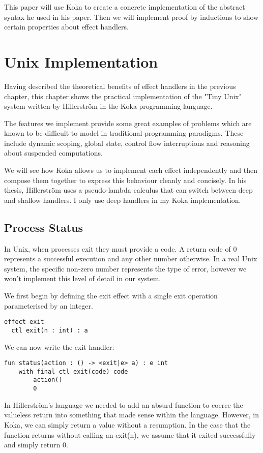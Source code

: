 \documentclass[logo,bsc,singlespacing,parskip]{infthesis}
\begin{document}
This paper will use Koka to create a concrete implementation of the abstract syntax he used in his paper. Then we will implement proof by inductions to show certain properties about effect handlers.

\chapter{Unix Implementation}
Having described the theoretical benefits of effect handlers in the previous chapter, this chapter shows the practical implementation of the "Tiny Unix" system written by Hillerström in the Koka programming language. 

The features we implement provide some great examples of problems which are known to be difficult to model in traditional programming paradigms.  These include dynamic scoping, global state, control flow interruptions and reasoning about suspended computations. 

We will see how Koka allows us to implement each effect independently and then compose them together to express this behaviour cleanly and concisely.
In his thesis, Hillerström uses a pseudo-lambda calculus that can switch between deep and shallow handlers. I only use deep handlers in my Koka implementation.



\section{Process Status}
In Unix, when processes exit they must provide a code. A return code of 0 represents a successful execution and any other number otherwise. In a real Unix system, the specific non-zero number represents the type of error, however we won't implement this level of detail in our system.

We first begin by defining the exit effect with a single exit operation parameterised by an integer.
\begin{lstlisting}
effect exit
  ctl exit(n : int) : a
\end{lstlisting}

We can now write the exit handler:
\begin{lstlisting}
fun status(action : () -> <exit|e> a) : e int
    with final ctl exit(code) code
        action()
        0
\end{lstlisting}
In Hillerström's language we needed to add an absurd function to coerce the valueless return into something that made sense within the language. However, in Koka, we can simply return a value without a resumption. In the case that the function returns without calling an exit(n), we assume that it exited successfully and simply return 0.
\end{document}
